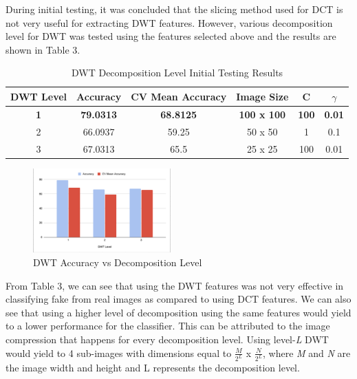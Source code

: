 \documentclass{icsthesis}
\begin{document}
\begin{mainmatter}
During initial testing, it was concluded that the slicing method used for DCT is not very useful for extracting DWT features. However, various decomposition level for DWT was tested using the features selected above and the results are shown in Table 3. 
\begin{table}[ht]
\centering
\begin{tabular}{|c|c|c|c|c|c|}
\hline
DWT Level  & Accuracy         & CV Mean Accuracy & Image Size         & C            &  $\gamma$          \\ \hline
\textbf{1} & \textbf{79.0313} & \textbf{68.8125} & \textbf{100 x 100} & \textbf{100} & \textbf{0.01} \\ \hline
2          & 66.0937          & 59.25            & 50 x 50            & 1            & 0.1           \\ \hline
3          & 67.0313          & 65.5             & 25 x 25            & 100          & 0.01          \\ \hline
\end{tabular}
\caption{DWT Decomposition Level Initial Testing Results}
\end{table}

\begin{figure}[ht]
    \centering
    \vspace{4ex}
	\includegraphics[width=200px]{imgs/dwt_level.png}
    \caption{DWT Accuracy vs Decomposition Level}
    \label{fig:enter-label}
\end{figure}

From Table 3, we can see that using the DWT features was not very effective in classifying fake from real images as compared to using DCT features. We can also see that using a higher level of decomposition using the same features would yield to a lower performance for the classifier. This can be attributed to the image compression that happens for every decomposition level. Using level-\textit{L} DWT would yield to 4 sub-images with dimensions equal to \( \frac{M}{2^L} \) x \( \frac{N}{2^L} \), where \textit{M} and \textit{N} are the image width and height and L represents the decomposition level.



\end{mainmatter}
\end{document}

